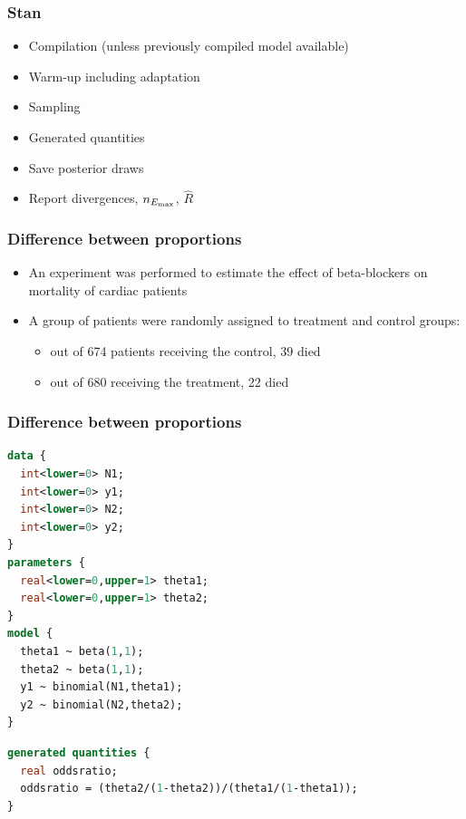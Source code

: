 \documentclass[10pt,handout]{beamer}
\begin{document}
\begin{frame}

\frametitle{Stan}

  \begin{itemize}
  \item Compilation (unless previously compiled model available)
  \item Warm-up including adaptation
  \item Sampling
  \item Generated quantities
  \item Save posterior draws
  \item Report divergences, $n_{E_{\rm max}}$, $\widehat{R}$
  \end{itemize}

\end{frame}

\begin{frame}[fragile]

\frametitle{Difference between proportions}

\begin{itemize}
  \item An experiment was performed to estimate the effect of
    beta-blockers on mortality of cardiac patients
  \item A group of
    patients were randomly assigned to treatment and control groups:
    \begin{itemize}
    \item out of 674 patients receiving the control, 39 died
    \item out of 680 receiving the treatment, 22 died
    \end{itemize}
  \end{itemize}
\end{frame}

\begin{frame}[fragile]

\frametitle{Difference between proportions}


  {\small\color{gray}
    {
\begin{lstlisting}[language=Stan]
data {
  int<lower=0> N1;
  int<lower=0> y1;
  int<lower=0> N2;
  int<lower=0> y2;
}
parameters {
  real<lower=0,upper=1> theta1;
  real<lower=0,upper=1> theta2;
}
model {
  theta1 ~ beta(1,1);
  theta2 ~ beta(1,1);
  y1 ~ binomial(N1,theta1);
  y2 ~ binomial(N2,theta2);
}
\end{lstlisting}
    }
    {
\begin{lstlisting}[language=Stan]
generated quantities {
  real oddsratio;
  oddsratio = (theta2/(1-theta2))/(theta1/(1-theta1));
}
\end{lstlisting}
    }
  }
\end{frame}
\end{document}

